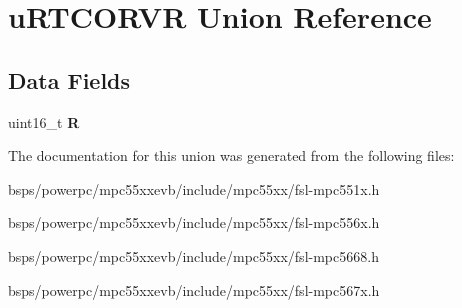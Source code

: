 \hypertarget{unionuRTCORVR}{}\section{u\+R\+T\+C\+O\+R\+VR Union Reference}
\label{unionuRTCORVR}
\subsection*{Data Fields}
\begin{DoxyCompactItemize}
\item 
\mbox{\label{unionuRTCORVR_a731a2b8ed450a429dcb5a11879689e6b}} 
uint16\+\_\+t {\bfseries R}
\end{DoxyCompactItemize}


The documentation for this union was generated from the following files\+:\begin{DoxyCompactItemize}
\item 
bsps/powerpc/mpc55xxevb/include/mpc55xx/fsl-\/mpc551x.\+h\item 
bsps/powerpc/mpc55xxevb/include/mpc55xx/fsl-\/mpc556x.\+h\item 
bsps/powerpc/mpc55xxevb/include/mpc55xx/fsl-\/mpc5668.\+h\item 
bsps/powerpc/mpc55xxevb/include/mpc55xx/fsl-\/mpc567x.\+h\end{DoxyCompactItemize}
